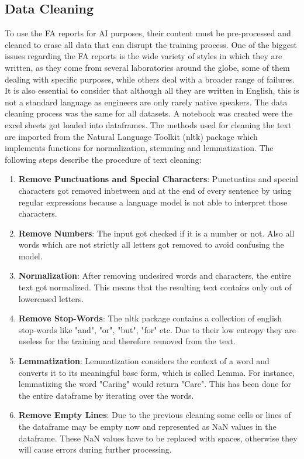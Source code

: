 \subsection{Data Cleaning}
To use the FA reports for AI purposes, their content must be pre-processed and cleaned to erase all data that can disrupt the training process. One of the biggest issues regarding the FA reports is the wide variety of styles in which they are written, as they come from several laboratories around the globe, some of them dealing with specific purposes, while others deal with a broader range of failures. It is also essential to consider that although all they are written in English, this is not a standard language as engineers are only rarely native speakers. \newline
The data cleaning process was the same for all datasets. A notebook was created were the excel sheets got loaded into dataframes. The methods used for cleaning the text are imported from the \alert{Natural Language Toolkit (nltk)} package which implements functions for normalization, stemming and lemmatization.
The following steps describe the procedure of text cleaning:

\begin{enumerate}
	\item \textbf{Remove Punctuations and Special Characters}: Punctuatins and special characters got removed inbetween and at the end of every sentence by using regular expressions because a language model is not able to interpret those characters. 
	\item \textbf{Remove Numbers}: The input got checked if it is a number or not. Also all words which are not strictly all letters got removed to avoid confusing the model.
	\item \textbf{Normalization}: After removing undesired words and characters, the entire text got normalized. This means that the resulting text contains only out of lowercased letters.
	\item \textbf{Remove Stop-Words}: The nltk package contains a collection of english stop-words like "and", "or", "but", "for" etc. Due to their low entropy they are useless for the training and therefore removed from the text.
	\item \textbf{Lemmatization}: Lemmatization considers the context of a word and converts it to its meaningful base form, which is called Lemma. For instance, lemmatizing the word "Caring" would return "Care". This has been done for the entire dataframe by iterating over the words.
	\item \textbf{Remove Empty Lines}: Due to the previous cleaning some cells or lines of the dataframe may be empty now and represented as NaN values in the dataframe. These NaN values have to be replaced with spaces, otherwise they will cause errors during further processing.
\end{enumerate}


